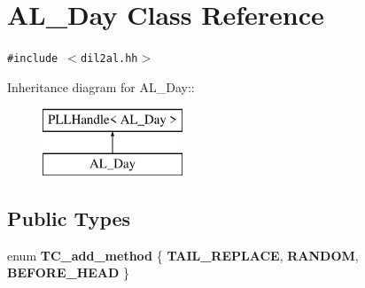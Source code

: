 \section{AL\_\-Day  Class Reference}
\label{classAL__Day}
{\tt \#include $<$dil2al.hh$>$}

Inheritance diagram for AL\_\-Day::\begin{figure}[H]
\begin{center}
\leavevmode
\includegraphics[height=2cm]{classAL__Day}
\end{center}
\end{figure}
\subsection*{Public Types}
\begin{CompactItemize}
\item 
enum {\bf TC\_\-add\_\-method} \{ {\bf TAIL\_\-REPLACE}, 
{\bf RANDOM}, 
{\bf BEFORE\_\-HEAD}
 \}
\end{CompactItemize}

